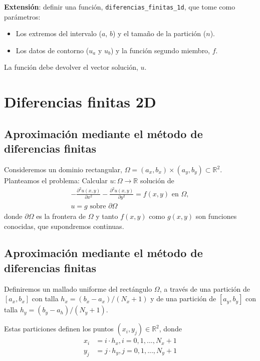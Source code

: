\documentclass[11pt,spanish,a4wide]{article}
\def\Rset{\mathbb{R}}
\newcommand{\en}{\mbox{\ en \ }}
\newcommand{\sobre}{\mbox{\ sobre \ }}
\begin{document}
\textbf{Extensión}: definir una función, \verb|diferencias_finitas_1d|,
que tome como parámetros:
\begin{itemize}
\item Los extremos del intervalo ($a$, $b$) y el tamaño de la
  partición ($n$).
\item Los datos de contorno ($u_a$ y $u_b$) y la función segundo
  miembro, $f$.
\end{itemize}
La función debe devolver el vector solución, $u$.

\section{Diferencias finitas 2D}

\subsection{Aproximación mediante el método de diferencias finitas}
\label{sec:diferencias-finitas-dim-2}

Consideremos un dominio rectangular, $\Omega=(a_x,b_x)\times(a_y,b_y)
\subset \Rset^2$. 
Planteamos el problema: Calcular $u:\Omega \to  \Rset$ solución de
\begin{align}
  \label{pb1d}
  -\frac{\partial^2 u(x,y) }{\partial x^2} 
  -\frac{\partial^2 u(x,y) }{\partial y^2} 
  = f(x,y) \en \Omega, \\
  u=g \sobre \partial\Omega
\end{align}
donde $\partial\Omega$ es la frontera de $\Omega$ y tanto $f(x,y)$
como $g(x,y)$ son funciones conocidas, que supondremos continuas.


\subsection{Aproximación mediante el método de diferencias finitas}
\label{sec:diferencias-finitas-dim-2}

Definiremos un mallado uniforme del rectángulo $\Omega$, a través de
una partición de $[a_x,b_x]$ con talla $h_x = (b_x-a_x)/(N_x+1)$ y de
una partición de $[a_y,b_y]$ con talla $h_y = (b_y-a_h)/(N_y+1)$.

Estas particiones definen los puntos $(x_i,y_j)\in\Rset^2$, donde
\begin{align*}
  x_i &= i\cdot h_x, i=0,1,...,N_x+1
  \\
  y_j &= j\cdot h_y, j=0,1,...,N_y+1
\end{align*}
\end{document}
